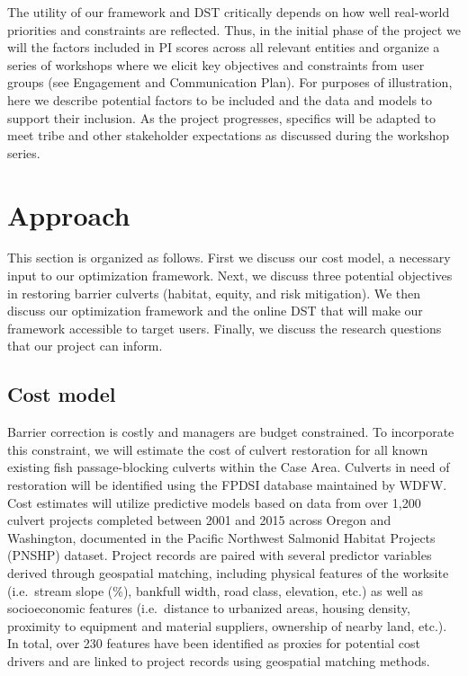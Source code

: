 The utility of our framework and DST critically depends on how well real-world priorities and constraints are reflected. Thus, in the initial phase of the project we will  the factors included in PI scores across all relevant entities and organize a series of workshops where we elicit key objectives and constraints from user groups (see Engagement and Communication Plan). For purposes of illustration, here we describe potential factors to be included and the data and models to support their inclusion. As the project progresses, specifics will be adapted to meet tribe and other stakeholder expectations as discussed during the workshop series.  

%
\section{Approach}


This section is organized as follows. First we discuss our cost model, a necessary input to our optimization framework. Next, we discuss three potential objectives in restoring barrier culverts (habitat, equity, and risk mitigation). We then discuss our optimization framework and the online DST that will make our framework accessible to target users. Finally, we discuss the research questions that our project can inform.

\subsection*{Cost model \label{sec:cost}}


Barrier correction is costly and managers are budget constrained. To incorporate this constraint, we will estimate the cost of culvert restoration for all known existing fish passage-blocking culverts within the Case Area. Culverts in need of restoration will be identified using the FPDSI database maintained by WDFW. Cost estimates will utilize predictive models based on data from over 1,200 culvert projects completed between 2001 and 2015 across Oregon and Washington, documented in the Pacific Northwest Salmonid Habitat Projects (PNSHP) dataset. Project records are paired with several predictor variables derived through geospatial matching, including physical features of the worksite (i.e.\ stream slope (\%), bankfull width, road class, elevation, etc.) as well as socioeconomic features (i.e.\ distance to urbanized areas, housing density, proximity to equipment and material suppliers, ownership of nearby land, etc.). In total, over 230 features have been identified as proxies for potential cost drivers and are linked to project records using geospatial matching methods. 

